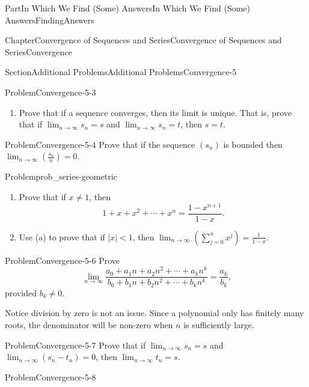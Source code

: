 \documentclass[oneside,10pt,]{book}
\newcommand{\blocktitlefont}{\relax}
\numberwithin{equation}{part}
\def\limit#1#2#3{{\displaystyle\lim_{#1\rightarrow #2}#3}}
\newcommand{\eps}{\varepsilon}
\newcommand{\lt}{<}
\begin{document}
\begin{partptx}{Part}{In Which We Find (Some) Answers}{}{In Which We Find (Some) Answers}{}{}{FindingAnswers}
\begin{chapterptx}{Chapter}{Convergence of Sequences and Series}{}{Convergence of Sequences and Series}{}{}{Convergence}
\begin{sectionptx}{Section}{Additional Problems}{}{Additional Problems}{}{}{Convergence-5}
\begin{problem}{Problem}{}{Convergence-5-3}
\begin{enumerate}[font=\bfseries,label=(\alph*),ref=\alph*]
\noindent\textbf{\blocktitlefont Hint}.\hypertarget{Convergence-5-3-2-2}{}\quad{}Assume for contradiction, that \(s>t\) and use the definition of convergence with \(\eps=\frac{s-t}{2}\) to produce an \(n\) with \(s_n>t_n\).%
\item{}Prove that if a sequence converges, then its limit is unique.  That is, prove that if \(\lim_{n\rightarrow\infty}s_n=s\) and \(\lim_{n\rightarrow\infty}s_n=t\), then \(s=t\).%
\end{enumerate}%
\end{problem}
\begin{problem}{Problem}{}{Convergence-5-4}%
Prove that if the sequence \(\left(s_n\right)\) is bounded then \(\lim_{n\rightarrow\infty}\left(\frac{s_n}{n}\right)=0\).%
\end{problem}
\begin{problem}{Problem}{}{prob_series-geometric}%
\begin{enumerate}[font=\bfseries,label=(\alph*),ref=\alph*]%
\item{}Prove that if \(x\neq 1\), then%
\begin{equation*}
1+x+x^2+\cdots+x^n=\frac{1-x^{n+1}}{1-x}\text{.}
\end{equation*}
%
\item{}Use (a) to prove that if \(|x|\lt 1\), then \(\lim_{n\rightarrow\infty}\left(\sum_{j=0}^nx^j\right)=\frac{1}{1-x}\).%
\end{enumerate}%
\end{problem}
\begin{problem}{Problem}{}{Convergence-5-6}%
 Prove%
\begin{equation*}
\lim_{n\rightarrow\infty}\frac{a_0+a_1n+a_2n^2+
\cdots+a_kn^k}{b_0+b_1n+b_2n^2+\cdots+b_kn^k}=\frac{a_k}{b_k}\text{,}
\end{equation*}
provided \(b_k\neq 0\).%
\par
Notice division by zero is not an issue.  Since a polynomial only has finitely many roots, the denominator will be non-zero when \(n\) is sufficiently large.%
\end{problem}
\begin{problem}{Problem}{}{Convergence-5-7}%
Prove that if \(\limit{n}{\infty}{s_n}=s\) and \(\limit{n}{\infty}{\left(s_n-t_n\right)}=0\), then \(\limit{n}{\infty}{t_n}=s\).%
\end{problem}
\begin{problem}{Problem}{}{Convergence-5-8}%
\begin{enumerate}[font=\bfseries,label=(\alph*),ref=\alph*]%

\end{enumerate}
\end{problem}
\end{sectionptx}
\end{chapterptx}
\end{partptx}
\end{document}
